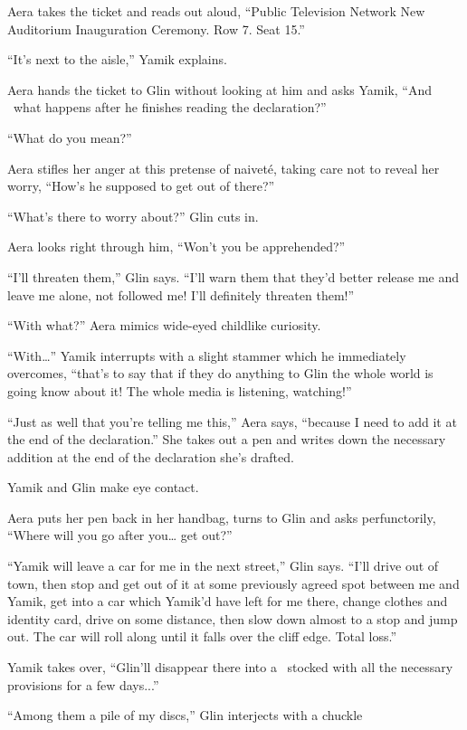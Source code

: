 \documentclass[twoside,11pt]{book}
\begin{document}
Aera takes the ticket and reads out aloud, ``Public Television Network New Auditorium Inauguration
Ceremony. Row 7. Seat 15.''

``It's next to the aisle,'' Yamik explains.

Aera hands the ticket to Glin without looking at him and asks Yamik, ``And \ what happens after he finishes
reading the declaration?''

``What do you mean?''

Aera stifles her anger at this pretense of naivet\'e, taking care not to reveal her worry, ``How's he
supposed to get out of there?''

``What's there to worry about?'' Glin cuts in{.}

Aera looks right through him, ``Won't you be apprehended?''

``I'll threaten them,'' Glin says. ``I'll warn them that they'd better release me
and leave me alone, not followed me! I'll definitely threaten them!''

``With what?'' Aera mimics wide-eyed childlike curiosity.

``With{\dots}'' Yamik interrupts with a slight stammer which he immediately overcomes,
``that's to say that if they do anything to Glin the whole world is going know about it! The whole media
is listening, watching!''

``Just as well that you're telling me this,'' Aera says, ``because I need to add
it at the end of the declaration.'' She takes out a pen and writes down the necessary addition at the end
of the declaration she's drafted.

Yamik and Glin make eye contact.

Aera puts her pen back in her handbag, turns to Glin and asks perfunctorily, ``Where will you go after
you{\dots} get out?''

``Yamik will leave a car for me in the next street,'' Glin says. ``I'll drive out
of town, then stop and get out of it at some previously agreed spot between me and Yamik, get into a car which Yamik'd
have left for me there, change clothes and identity card, drive on some distance, then slow down almost to a stop and
jump out. The car will roll along until it falls over the cliff edge. Total loss.''

Yamik takes over, ``Glin'll disappear there into a \ stocked with all the necessary provisions for a few
days...''

``Among them a pile of my discs,'' Glin interjects with a chuckle
\end{document}

